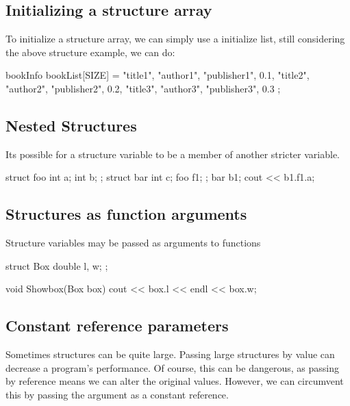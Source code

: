 \documentclass{report}
\begin{document}
	\subsection{Initializing a structure array}
	\bigbreak \noindent 
	To initialize a structure array, we can simply use a initialize list, still considering the above structure example, we can do:
	\bigbreak \noindent 
	
	\begin{cppcode}
bookInfo bookList[SIZE] = {
                            {"title1", "author1", "publisher1", 0.1},
                            {"title2", "author2", "publisher2", 0.2},
                            {"title3", "author3", "publisher3", 0.3}
                            };
	\end{cppcode}
	
	\bigbreak \noindent 

	\pagebreak
	\subsection{Nested Structures}
	\bigbreak \noindent 
	Its possible for a structure variable to be a member of another stricter variable.
	\bigbreak \noindent 
	
	\begin{cppcode}
struct foo {
    int a;
    int b;
};
struct bar {
    int c;
    foo f1;
};
bar b1;
cout << b1.f1.a;
	\end{cppcode}
	

	\bigbreak \noindent 
	\subsection{Structures as function arguments}
	\bigbreak \noindent 
	\begin{concept}
	   Structure variables may be passed as arguments to functions 
	\end{concept}
	\bigbreak \noindent 
	
	\begin{cppcode}
struct Box {
    double l, w;
};

void Showbox(Box box) {
    cout << box.l << endl << box.w;
}
	\end{cppcode}
	
	
	\bigbreak \noindent 
	\bigbreak \noindent 

	\pagebreak
	\subsection{Constant reference parameters}
	\bigbreak \noindent 
	\begin{concept}
	   Sometimes structures can be quite large. Passing large structures by value can decrease a program's performance. Of course, this can be dangerous, as passing by reference means we can alter the original values. However, we can circumvent this by passing the argument as a constant reference.
	\end{concept}
	\bigbreak \noindent 
	
\end{document}
